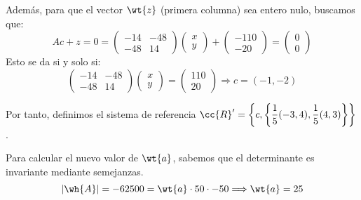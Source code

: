 \begin{ejercicio}
\begin{enumerate}
        Además, para que el vector $\wt{z}$ (primera columna) sea entero nulo, buscamos que:
        \begin{equation*}
            Ac + z = 0
            =  \left(\begin{array}{cc}
                -14 & -48 \\
                -48 & 14
            \end{array}\right)\left(\begin{array}{c}
                x\\y
            \end{array}\right) + \left(\begin{array}{c}
                -110 \\ -20
            \end{array}\right) = \left(\begin{array}{c}
                0\\0
            \end{array}\right)
        \end{equation*}
        Esto se da si y solo si:
        \begin{equation*}
            \left(\begin{array}{cc}
                -14 & -48 \\
                -48 & 14
            \end{array}\right)\left(\begin{array}{c}
                x\\y
            \end{array}\right) = \left(\begin{array}{c}
                110 \\ 20
            \end{array}\right) \Longrightarrow c=(-1,-2)
        \end{equation*}

        Por tanto, definimos el sistema de referencia $\cc{R}'=\left\{c, \left\{\dfrac{1}{5}(-3,4), \dfrac{1}{5}(4,3)\right\}\right\}$.

        Para calcular el nuevo valor de $\wt{a}$, sabemos que el determinante es invariante mediante semejanzas.
        \begin{equation*}
            |\wh{A}|=-62500= \wt{a}\cdot 50\cdot -50\Longrightarrow \wt{a}=25
        \end{equation*}
        

\end{enumerate}
\end{ejercicio}
